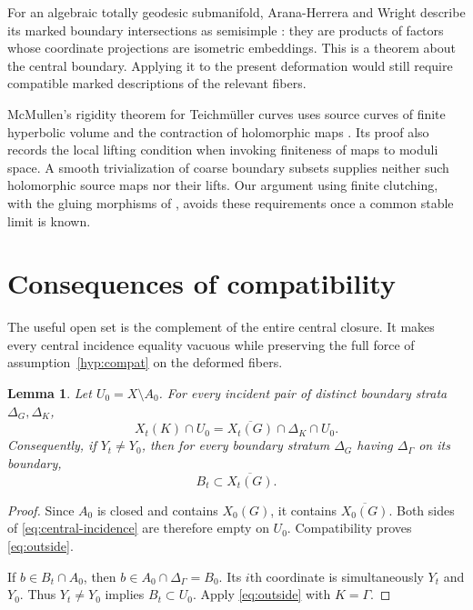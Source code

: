 \documentclass[11pt]{article}
\newcommand{\cl}[1]{\overline{#1}}
\newtheorem{lemma}[theorem]{Lemma}
\theoremstyle{definition}
\theoremstyle{remark}
\begin{document}
For an algebraic totally geodesic submanifold, Arana-Herrera and Wright describe its marked boundary intersections as semisimple \cite[Theorem~1.3]{AW}: they are products of factors whose coordinate projections are isometric embeddings. This is a theorem about the central boundary. Applying it to the present deformation would still require compatible marked descriptions of the relevant fibers.

McMullen's rigidity theorem for Teichm\"uller curves uses source curves of finite hyperbolic volume and the contraction of holomorphic maps \cite[Theorem~1 and its proof]{McMullen}. 
Its proof also records the local lifting condition when invoking finiteness of maps to moduli space. A smooth trivialization of coarse boundary subsets supplies neither such holomorphic source maps nor their lifts. Our argument using finite clutching, with the gluing morphisms of \cite[Definition~4.1 and Proposition~4.4]{EF}, avoids these requirements once a common stable limit is known.

\section{Consequences of compatibility}\label{sec:compat}

The useful open set is the complement of the entire central closure. It makes every central incidence equality vacuous while preserving the full force of assumption~\ref{hyp:compat} on the deformed fibers.

\begin{lemma}\label{lem:outside}
Let $U_0=X\setminus A_0$. For every incident pair of distinct boundary strata $\Delta_G,\Delta_K$,
\begin{equation}\label{eq:outside}
 X_t(K)\cap U_0=\cl{X_t(G)}\cap\Delta_K\cap U_0.
\end{equation}
Consequently, if $Y_t\ne Y_0$, then for every boundary stratum $\Delta_G$ having $\Delta_\Gamma$ on its boundary,
\begin{equation}\label{eq:moving}
 B_t\subset\cl{X_t(G)}.
\end{equation}
\end{lemma}

\begin{proof}
Since $A_0$ is closed and contains $X_0(G)$, it contains $\cl{X_0(G)}$. Both sides of \eqref{eq:central-incidence} are therefore empty on $U_0$. Compatibility proves \eqref{eq:outside}.

If $b\in B_t\cap A_0$, then $b\in A_0\cap\Delta_\Gamma=B_0$. Its $i$th coordinate is simultaneously $Y_t$ and $Y_0$. Thus $Y_t\ne Y_0$ implies $B_t\subset U_0$. Apply \eqref{eq:outside} with $K=\Gamma$.
\end{proof}
\end{document}
